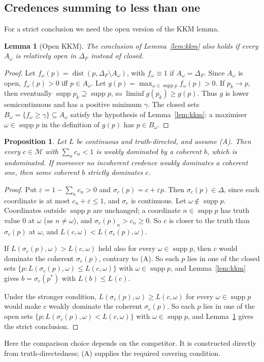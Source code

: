 \documentclass[11pt]{article}
\newtheorem{lemma}[theorem]{Lemma}
\newtheorem{proposition}[theorem]{Proposition}
\theoremstyle{definition}
\theoremstyle{remark}
\newcommand{\M}{\mathcal M}
\newcommand{\supp}{\operatorname{supp}}
\begin{document}
\subsection{Credences summing to less than one}
For a strict conclusion we need the open version of the KKM lemma.
\begin{lemma}[Open KKM]\label{lem:openkkm}
The conclusion of Lemma~\ref{lem:kkm} also holds if every $A_\omega$ is relatively open in $\Delta_F$ instead of closed.
\end{lemma}
\begin{proof}
Let $f_\omega(p)=\operatorname{dist}(p,\Delta_F\setminus A_\omega)$, with $f_\omega\equiv1$ if $A_\omega=\Delta_F$. Since $A_\omega$ is open, $f_\omega(p)>0$ iff $p\in A_\omega$. Let $g(p)=\max_{\omega\in\supp p}f_\omega(p)>0$. If $p_k\to p$, then eventually $\supp p_k\supseteq\supp p$, so $\liminf g(p_k)\ge g(p)$. Thus $g$ is lower semicontinuous and has a positive minimum $\gamma$. The closed sets $B_\omega=\{f_\omega\ge\gamma\}\subseteq A_\omega$ satisfy the hypothesis of Lemma~\ref{lem:kkm}: a maximiser $\omega\in\supp p$ in the definition of $g(p)$ has $p\in B_\omega$.
\end{proof}

\begin{proposition}\label{prop:joyce-sub}
Let $L$ be continuous and truth-directed, and assume (A). Then every $c\in\M$ with $\sum_nc_n<1$ is weakly dominated by a coherent $b$, which is undominated. If moreover no incoherent credence weakly dominates a coherent one, then some coherent $b$ strictly dominates $c$.
\end{proposition}
\begin{proof}
Put $\varepsilon=1-\sum_nc_n>0$ and $\sigma_c(p)=c+\varepsilon p$. Then $\sigma_c(p)\in\Delta$, since each coordinate is at most $c_n+\varepsilon\le1$, and $\sigma_c$ is continuous. Let $\omega\notin\supp p$. Coordinates outside $\supp p$ are unchanged; a coordinate $n\in\supp p$ has truth value $0$ at $\omega$ (as $n\ne\omega$), and $\sigma_c(p)_n>c_n\ge0$. So $c$ is closer to the truth than $\sigma_c(p)$ at $\omega$, and $L(c,\omega)<L(\sigma_c(p),\omega)$.

If $L(\sigma_c(p),\omega)>L(c,\omega)$ held also for every $\omega\in\supp p$, then $c$ would dominate the coherent $\sigma_c(p)$, contrary to (A). So each $p$ lies in one of the closed sets $\{p:L(\sigma_c(p),\omega)\le L(c,\omega)\}$ with $\omega\in\supp p$, and Lemma~\ref{lem:kkm} gives $b=\sigma_c(p^*)$ with $L(b)\le L(c)$.

Under the stronger condition, $L(\sigma_c(p),\omega)\ge L(c,\omega)$ for every $\omega\in\supp p$ would make $c$ weakly dominate the coherent $\sigma_c(p)$. So each $p$ lies in one of the open sets $\{p:L(\sigma_c(p),\omega)<L(c,\omega)\}$ with $\omega\in\supp p$, and Lemma~\ref{lem:openkkm} gives the strict conclusion.
\end{proof}
Here the comparison choice depends on the competitor. It is constructed directly from truth-directedness; (A) supplies the required covering condition.
\end{document}
